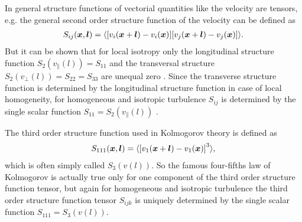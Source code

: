 In general structure functions of vectorial quantities like the velocity are
tensors, e.g. the general second order structure function of the velocity can
be defined as
\begin{align}
S_{ij}(\boldsymbol{x},\boldsymbol{l}) =  
\langle { \left[ v_i(\boldsymbol{x}+\boldsymbol{l})-v_i(\boldsymbol{x}) \right] }
{ \left[ v_j(\boldsymbol{x}+\boldsymbol{l})-v_j(\boldsymbol{x}) \right] } \rangle.
\end{align}
But it can be shown that for local isotropy only the longitudinal
structure function $S_2(v_{\parallel}(l))=S_{11}$ and the transversal structure
$S_2(v_{\perp}(l))=S_{22}=S_{33}$ are unequal zero \citep{Pope2000}. Since 
the transverse structure function is determined by the longitudinal structure
function in case of local homogeneity, for homogeneous and isotropic 
turbulence $S_{ij}$ is determined by the single scalar
function $S_{11} = S_2(v_{\parallel}(l))$ \citep{Pope2000}.

The third order structure function used in Kolmogorov theory is
defined as 
\begin{align}
S_{111}(\boldsymbol{x},\boldsymbol{l}) = \langle { \left[ v_1(\boldsymbol{x}+\boldsymbol{l})-v_1(\boldsymbol{x}) \right] }^3 \rangle,
\end{align}
which is often simply called $S_3(v(l))$. So the famous four-fifths law of
Kolmogorov is actually true only for one component of the third order
structure function tensor, but again for homogeneous and isotropic turbulence
the third order structure function tensor $S_{ijk}$ is uniquely determined by
the single scalar function $S_{111}=S_3(v(l))$.


